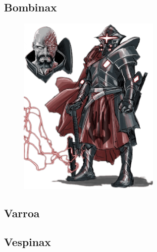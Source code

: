 \subsection{Bombinax} \label{sec:bombinax}
\begin{figure}[h!]
    \centering
    \includegraphics[height=250pt]{_img/pnjs/bombinax.png}
\end{figure}
\newpage

\subsection{Varroa} \label{sec:varroa}
\newpage
\subsection{Vespinax} \label{sec:vespinax}
